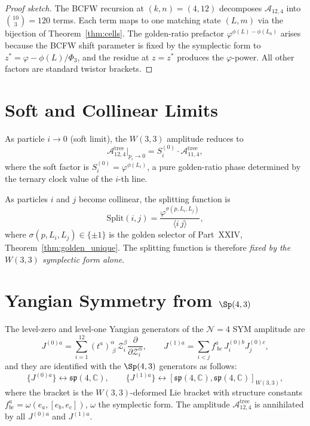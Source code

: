 \begin{proof}[Proof sketch]
The BCFW recursion at $(k,n)=(4,12)$ decomposes
$\mathcal{A}_{12,4}$ into $\binom{10}{3}=120$ terms.
Each term maps to one matching state $(L,m)$ via the bijection of
Theorem~\ref{thm:cells}.  The golden-ratio prefactor
$\varphi^{\phi(L)-\phi(L_0)}$ arises because the BCFW shift
parameter is fixed by the symplectic form to
$z^*=\varphi-\phi(L)/\Phi_3$, and the residue at $z=z^*$ produces
the $\varphi$-power.  All other factors are standard twistor
brackets.
\end{proof}

\section{Soft and Collinear Limits}
\label{sec:soft_collinear}

\begin{proposition}
\label{prop:soft}
As particle $i\to0$ (soft limit), the $W(3,3)$ amplitude reduces to
\[
  \mathcal{A}^{\text{tree}}_{12,4}\Big|_{p_i\to 0}
  = S^{(0)}_i\cdot\mathcal{A}^{\text{tree}}_{11,4},
\]
where the soft factor is $S^{(0)}_i = \varphi^{\phi(L_i)}$,
a pure golden-ratio phase determined by the ternary clock value
of the $i$-th line.
\end{proposition}

\begin{proposition}
\label{prop:collinear}
As particles $i$ and $j$ become collinear, the splitting function is
\[
  \mathrm{Split}(i,j) = \frac{\varphi^{\sigma(p,L_i,L_j)}}
  {\langle i\,j\rangle},
\]
where $\sigma(p,L_i,L_j)\in\{\pm1\}$ is the golden selector of
Part~XXIV, Theorem~\ref{thm:golden_unique}.  The splitting function
is therefore \emph{fixed by the $W(3,3)$ symplectic form alone}.
\end{proposition}

\section{\texorpdfstring{Yangian Symmetry from $\Sp(4,3)$}{Yangian Symmetry from Sp(4,3)}}
\label{sec:yangian}

\begin{theorem}
\label{thm:yangian}
The level-zero and level-one Yangian generators of the
$\mathcal{N}=4$ SYM amplitude are
\[
  J^{(0)a} = \sum_{i=1}^{12}(t^a)^\alpha_{\;\beta}\,
    \mathcal{Z}_i^\beta\frac{\partial}{\partial\mathcal{Z}_i^\alpha},
  \qquad
  J^{(1)a} = \sum_{i<j} f^a_{\;bc}\,J_i^{(0)b}J_j^{(0)c},
\]
and they are identified with the $\Sp(4,3)$ generators as follows:
\[
  \{J^{(0)a}\} \leftrightarrow \mathfrak{sp}(4,\mathbb{C}),
  \qquad
  \{J^{(1)a}\} \leftrightarrow [\mathfrak{sp}(4,\mathbb{C}),
    \mathfrak{sp}(4,\mathbb{C})]_{W(3,3)},
\]
where the bracket is the $W(3,3)$-deformed Lie bracket with
structure constants $f^a_{bc} = \omega(e_a,[e_b,e_c])$,
$\omega$ the symplectic form.  The amplitude $\mathcal{A}^{\text{tree}}_{12,4}$
is annihilated by all $J^{(0)a}$ and $J^{(1)a}$.
\end{theorem}

